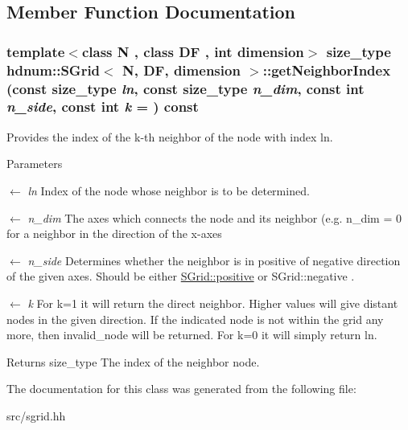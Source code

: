 \subsection{Member Function Documentation}
\hypertarget{classhdnum_1_1SGrid_a64eff228d60e47b1ecceaf331ba54173}{
\subsubsection[{getNeighborIndex}]{\setlength{\rightskip}{0pt plus 5cm}template$<$class N , class DF , int dimension$>$ {\bf size\_\-type} {\bf hdnum::SGrid}$<$ N, DF, dimension $>$::getNeighborIndex (const {\bf size\_\-type} {\em ln}, \/  const {\bf size\_\-type} {\em n\_\-dim}, \/  const int {\em n\_\-side}, \/  const int {\em k} = {}) const}}
\label{classhdnum_1_1SGrid_a64eff228d60e47b1ecceaf331ba54173}


Provides the index of the k-\/th neighbor of the node with index ln. 


\begin{DoxyParams}{Parameters}
\item[\mbox{$\leftarrow$} {\em ln}]Index of the node whose neighbor is to be determined.\item[\mbox{$\leftarrow$} {\em n\_\-dim}]The axes which connects the node and its neighbor (e.g. n\_\-dim = 0 for a neighbor in the direction of the x-\/axes\item[\mbox{$\leftarrow$} {\em n\_\-side}]Determines whether the neighbor is in positive of negative direction of the given axes. Should be either \hyperlink{classhdnum_1_1SGrid_a0824662b4e8828f13b1600a4226e82a0}{SGrid::positive} or SGrid::negative .\item[\mbox{$\leftarrow$} {\em k}]For k=1 it will return the direct neighbor. Higher values will give distant nodes in the given direction. If the indicated node is not within the grid any more, then invalid\_\-node will be returned. For k=0 it will simply return ln.\end{DoxyParams}
\begin{DoxyReturn}{Returns}
size\_\-type The index of the neighbor node. 
\end{DoxyReturn}


The documentation for this class was generated from the following file:\begin{DoxyCompactItemize}
\item 
src/sgrid.hh\end{DoxyCompactItemize}
